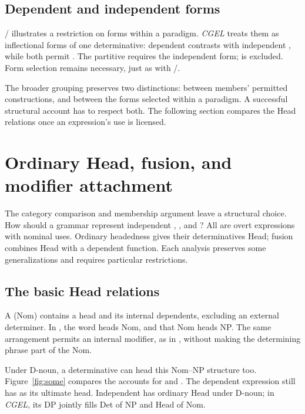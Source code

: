 \documentclass[12pt]{article}
\begin{document}
\subsection{Dependent and independent forms}\label{sec:form-selection}

/ illustrates a restriction on forms within a paradigm. \textit{CGEL} treats them as inflectional forms of one determinative: dependent  contrasts with independent , while both permit  \citep[389--390]{huddleston2002}. The partitive  requires the independent form;  is excluded. Form selection remains necessary, just as with /.

The broader grouping preserves two distinctions: between members' permitted constructions, and between the forms selected within a paradigm. A successful structural account has to respect both. The following section compares the Head relations once an expression's use is licensed.

\section{Ordinary Head, fusion, and modifier attachment}\label{sec:evidence}

The category comparison and membership argument leave a structural choice. How should a grammar represent independent , , and ? All are overt expressions with nominal uses. Ordinary headedness gives their determinatives Head; fusion combines Head with a dependent function. Each analysis preserves some generalizations and requires particular restrictions.

\subsection{The basic Head relations}\label{sec:head-relations}

A  (Nom) contains a head and its internal dependents, excluding an external determiner. In , the word  heads Nom, and that Nom heads NP. The same arrangement permits an internal modifier, as in , without making the determining phrase part of the Nom.

Under D-noun, a determinative can head this Nom--NP structure too. Figure~\ref{fig:some} compares the accounts for  and . The dependent expression still has  as its ultimate head. Independent  has ordinary Head under D-noun; in \textit{CGEL}, its DP jointly fills Det of NP and Head of Nom.
\end{document}
